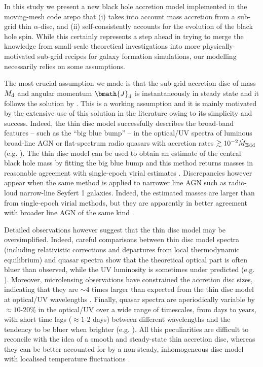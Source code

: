 \documentclass[a4paper,fleqn,usenatbib]{mnras}
\begin{document}
In this study we present a new black hole accretion model implemented in the moving-mesh code {\sc arepo} that (i) takes into account mass accretion from a sub-grid thin $\alpha$-disc, and (ii) self-consistently accounts for the evolution of the black hole spin.
While this certainly represents a step ahead in trying to merge the knowledge from small-scale theoretical investigations into more physically-motivated sub-grid recipes for galaxy formation simulations, our modelling necessarily relies on some assumptions.

The most crucial assumption we made is that the sub-grid accretion disc of mass $M_{\rm d}$ and angular momentum $\bmath{J}_{\rm d}$ is instantaneously in steady state and it follows the solution by \citet{shakura+73}.
This is a working assumption and it is mainly motivated by the extensive use of this solution in the literature owing to its simplicity and success. 
Indeed, the thin disc model successfully describes the broad-band features -- such as the ``big blue bump'' -- in the optical/UV spectra of luminous broad-line AGN or flat-spectrum radio quasars with accretion rates $\gtrsim 10^{-2} \dot{M}_{\rm Edd}$ (e.g. \citealt{ghisellini+10,davis+11,capellupo+15,sbarrato+16}).
The thin disc model can be used to obtain an estimate of the central black hole mass by fitting the big blue bump and this method returns masses in reasonable agreement with single-epoch virial estimates \citep{zheng+95, calderone+13, castignani+13}.
Discrepancies however appear when the same method is applied to narrower line AGN such as radio-loud narrow-line Seyfert 1 galaxies.
Indeed, the estimated masses are larger than from single-epoch virial methods, but they are apparently in better agreement with broader line AGN of the same kind \citep{calderone+13}.

Detailed observations however suggest that the thin disc model may be oversimplified.
Indeed, careful comparisons between thin disc model spectra (including relativistic corrections and departures from local thermodynamic equilibrium) and quasar spectra show that the theoretical optical part is often bluer than observed, while the UV luminosity is sometimes under predicted (e.g. \citealt{blaes+01, davis+07}).
Moreover, microlensing observations have constrained the accretion disc sizes, indicating that they are $\sim 4$ times larger than expected from the thin disc model at optical/UV wavelengths \citep{pooley+07, dai+10, morgan+10}.
Finally, quasar spectra are aperiodically variable by $\approx 10$-20\% in the optical/UV over a wide range of timescales, from days to years, with short time lags ($\approx 1$-2 days) between different wavelengths and the tendency to be bluer when brighter (e.g. \citealt{vandenberk+04, sesar+07, meusinger+11, ruan+14}).
All this peculiarities are difficult to reconcile with the idea of a smooth and steady-state thin accretion disc, whereas they can be better accounted for by a non-steady, inhomogeneous disc model with localised temperature fluctuations \citep{kelly+09, dexter+11, ruan+14, cai+16}.
\end{document}

